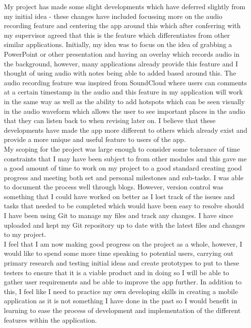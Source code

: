 \documentclass{report}
\begin{document}
My project has made some slight developments which have deferred slightly from my initial idea - these changes have included focussing more on the audio recording feature and centering the app around this which after conferring with my supervisor agreed that this is the feature which differentiates from other similar applications. Initially, my idea was to focus on the idea of grabbing a PowerPoint or other presentation and having an overlay which records audio in the background, however, many applications already provide this feature and I thought of using audio with notes being able to added based around this. The audio recording feature was inspired from SoundCloud where users can comments at a certain timestamp in the audio and this feature in my application will work in the same way as well as the ability to add hotspots which can be seen visually in the audio waveform which allows the user to see important places in the audio that they can listen back to when revising later on. I believe that these developments have made the app more different to others which already exist and provide a more unique and useful feature to users of the app.\\

My scoping for the project was large enough to consider some tolerance of time constraints that I may have been subject to from other modules and this gave me a good amount of time to work on my project to a good standard creating good progress and meeting both set and personal milestones and sub-tasks. I was able to document the process well through blogs. However, version control was something that I could have worked on better as I lost track of the issues and tasks that needed to be completed which would have been easy to resolve should I have been using Git to manage my files and track any changes. I have since uploaded and kept my Git repository up to date with the latest files and changes to my project.\\

I feel that I am now making good progress on the project as a whole, however, I would like to spend some more time speaking to potential users, carrying out primary research and testing initial ideas and create prototypes to put to these testers to ensure that it is a viable product and in doing so I will be able to gather user requirements and be able to improve the app further. In addition to this, I feel like I need to practice my own developing skills in creating a mobile application as it is not something I have done in the past so I would benefit in learning to ease the process of development and implementation of the different features within the application.\\
\end{document}
